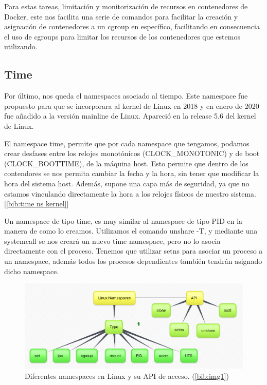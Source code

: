 \documentclass[12pt]{article}
\begin{document}
	\noindent Para estas tareas, limitación y monitorización de recursos en contenedores de Docker, este nos facilita una serie de comandos para facilitar la creación y asignación de contenedores a un cgroup en específico, facilitando en consecuencia el uso de cgroups para limitar los recursos de los contenedores que estemos utilizando.
	
	
	\pagebreak
	
	\subsection{Time}
	\par \noindent Por último, nos queda el namespaces asociado al tiempo. Este namespace fue propuesto para que se incorporara al kernel de Linux en 2018 y en enero de 2020 fue añadido a la versión mainline de Linux. Apareció en la release 5.6 del kernel de Linux. \\
	
	\par \noindent El namespace time, permite que por cada namespace que tengamos, podamos crear desfases entre los relojes monotónicos (CLOCK\_MONOTONIC) y de boot (CLOCK\_BOOTTIME), de la máquina host. Esto permite que dentro de los contendores se nos permita cambiar la fecha y la hora, sin tener que modificar la hora del sistema host. Además, supone una capa más de seguridad, ya que no estamos vinculando directamente la hora a los relojes físicos de nuestro sistema. [\ref{bib:time ns kernel}]\\
	
	\par \noindent Un namespace de tipo time, es muy similar al namespace de tipo PID en la manera de como lo creamos. Utilizamos el comando unshare -T, y mediante una systemcall se nos creará un nuevo time namespace, pero no lo asocia directamente con el proceso. Tenemos que utilizar setns para asociar un proceso a un namespace, además todos los procesos dependientes también tendrán asignado dicho namespace. 
	
	\vspace{80px}
	
	\begin{figure}[h!]
		\begin{center}
			\includegraphics[width=1\textwidth]{img/linux-namespace1.png}
			\caption{Diferentes namespaces en Linux y su API de acceso. (\ref{bib:img1})}
		\end{center}
	\end{figure}
	
\end{document}
